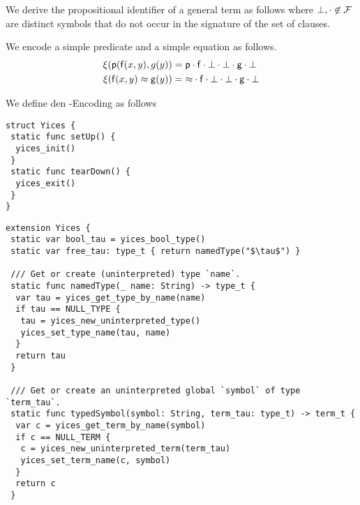 \begin{definition}
	We derive the propositional identifier of a general term as follows
where $\bot, \cdot\not\in{\mathcal F}$ are distinct symbols that do not occur in the signature of the set of clauses.
\end{definition}

\begin{example}
	We encode a simple predicate and a simple equation as follows.
	\begin{align*}
	\xi({\mathsf p}({\mathsf f}(x,y),g(y)) &= {\mathsf p}\cdot{\mathsf f}\cdot\bot\cdot\bot\cdot{\mathsf g}\cdot\bot\\
	\xi({\mathsf f}(x,y)\approx {\mathsf g}(y)) &= {\approx}\cdot{\mathsf f}\cdot\bot\cdot\bot\cdot{\mathsf g}\cdot\bot\\
	\end{align*}
\end{example}

\begin{definition}
	We define den \SMT-Encoding as follows
\end{definition}

\begin{lstlisting}[language=FLEA]
struct Yices {
 static func setUp() {
  yices_init()
 }
 static func tearDown() {
  yices_exit()
 }
}
\end{lstlisting}

\begin{lstlisting}[language=FLEA]
extension Yices {
 static var bool_tau = yices_bool_type()
 static var free_tau: type_t { return namedType("$\tau$") }
 
 /// Get or create (uninterpreted) type `name`.
 static func namedType(_ name: String) -> type_t {
  var tau = yices_get_type_by_name(name)
  if tau == NULL_TYPE {
   tau = yices_new_uninterpreted_type()
   yices_set_type_name(tau, name)
  }
  return tau
 }
 
 /// Get or create an uninterpreted global `symbol` of type `term_tau`.
 static func typedSymbol(symbol: String, term_tau: type_t) -> term_t {
  var c = yices_get_term_by_name(symbol)
  if c == NULL_TERM {
   c = yices_new_uninterpreted_term(term_tau)
   yices_set_term_name(c, symbol)
  } 
  return c
 }
\end{lstlisting}

